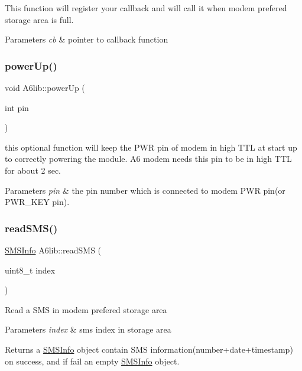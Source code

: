 This function will register your callback and will call it when modem prefered storage area is full. 
\begin{DoxyParams}{Parameters}
{\em cb} & pointer to callback function \\
\hline
\end{DoxyParams}
\mbox{\label{class_a6lib_add46e8926e5809cc7e33a7ad2817fcc5}} 
\subsubsection{\texorpdfstring{power\+Up()}{powerUp()}}
{\footnotesize\ttfamily void A6lib\+::power\+Up (\begin{DoxyParamCaption}\item[{int}]{pin }\end{DoxyParamCaption})}

this optional function will keep the P\+WR pin of modem in high T\+TL at start up to correctly powering the module. A6 modem needs this pin to be in high T\+TL for about 2 sec. 
\begin{DoxyParams}{Parameters}
{\em pin} & the pin number which is connected to modem P\+WR pin(or P\+W\+R\+\_\+\+K\+E\+Y pin). \\
\hline
\end{DoxyParams}
\mbox{\label{class_a6lib_aad58cce8168f9554470f3afa854afb29}} 
\subsubsection{\texorpdfstring{read\+S\+M\+S()}{readSMS()}}
{\footnotesize\ttfamily \mbox{\hyperlink{class_s_m_s_info}{S\+M\+S\+Info}} A6lib\+::read\+S\+MS (\begin{DoxyParamCaption}\item[{uint8\+\_\+t}]{index }\end{DoxyParamCaption})}

Read a S\+MS in modem prefered storage area 
\begin{DoxyParams}{Parameters}
{\em index} & sms index in storage area \\
\hline
\end{DoxyParams}
\begin{DoxyReturn}{Returns}
a \mbox{\hyperlink{class_s_m_s_info}{S\+M\+S\+Info}} object contain S\+MS information(number+date+timestamp) on success, and if fail an empty \mbox{\hyperlink{class_s_m_s_info}{S\+M\+S\+Info}} object. 
\end{DoxyReturn}
\mbox{\label{class_a6lib_a934e8451ed2125f0fee5bc720a99ed91}} 

